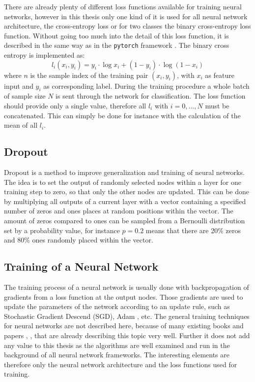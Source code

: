 There are already plenty of different loss functions available for training neural networks, however in this thesis only one kind of it is used for all neural network architecture, the cross-entropy loss or for two classes the binary cross-entropy loss function.
Without going too much into the detail of this loss function, it is described in the same way as in the \texttt{pytorch} framework \cite{Pytorch}.
The binary cross entropy is implemented as:
\begin{equation}
  l_i(x_i, y_i) = y_i \cdot \log x_i + (1 - y_i) \cdot \log (1 - x_i)
\end{equation}
where $n$ is the sample index of the training pair $(x_i, y_i)$, with $x_i$ as feature input and $y_i$ as corresponding label.
During the training procedure a whole batch of sample size $N$ is sent through the network for classification.
The loss function should provide only a single value, therefore all $l_i$ with $i = 0, \dots, N$ must be concatenated.
This can simply be done for instance with the calculation of the mean of all $l_i$.



\subsection{Dropout}
Dropout \cite{Hinton2012} is a method to improve generalization and training of neural networks.
The idea is to set the output of randomly selected nodes within a layer for one training step to zero, so that only the other nodes are updated.
This can be done by multiplying all outputs of a current layer with a vector containing a specified number of zeros and ones places at random positions within the vector.
The amount of zeros compared to ones can be sampled from a Bernoulli distribution set by a probability value, for instance $p=0.2$ means that there are 20\% zeros and 80\% ones randomly placed within the vector.



\subsection{Training of a Neural Network}
The training process of a neural network is usually done with backpropagation of gradients from a loss function at the output nodes.
Those gradients are used to update the parameters of the network according to an update rule, such as Stochastic Gradient Descend (SGD), Adam \cite{Kingma2015}, etc.
The general training techniques for neural networks are not described here, because of many existing books and papers \cite{LeCun2006}, \cite{Goodfellow2016}, \cite{DeepLearning} that are already describing this topic very well. 
Further it does not add any value to this thesis as the algorithms are well examined and run in the background of all neural network frameworks.
The interesting elements are therefore only the neural network architecture and the loss functions used for training.
